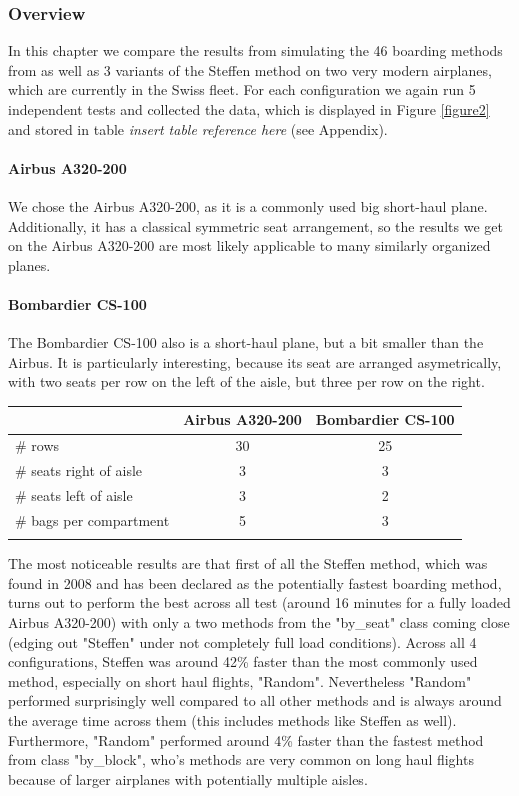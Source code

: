 \documentclass[11pt]{article}
\begin{document}
 
 \subsubsection{Overview}
 In this chapter we compare the results from simulating the 46 boarding methods from \cite{beus} as well as 3 variants of the Steffen method \cite{steffen} on two very modern airplanes, which are currently in the Swiss fleet. For each configuration we again run 5 independent tests and collected the data, which is displayed in Figure \ref{figure2} and stored in table \textit{insert table reference here} (see Appendix). 
 
 
 \paragraph{Airbus A320-200}
 We chose the Airbus A320-200, as it is a commonly used big short-haul plane. Additionally, it has a classical symmetric seat arrangement, so the results we get on the Airbus A320-200 are most likely applicable to many similarly organized planes. 


 \paragraph{Bombardier CS-100}
 The Bombardier CS-100 also is a short-haul plane, but a bit smaller than the Airbus. It is particularly interesting, because its seat are arranged asymetrically, with two seats per row on the left of the aisle, but three per row on the right.  

 \begin{tabular}{l|c c }

	 \hline
	&Airbus A320-200 &Bombardier CS-100 \\
	\hline
\# rows & 30&25   \\
\hline
\# seats right of aisle & 3 & 3 \\
	\hline
	\# seats left of aisle & 3 & 2\\
	\hline
	\# bags per compartment & 5 & 3\\
	\hline
	\\
\end{tabular}

 The most noticeable results are that first of all the Steffen method, which was found in 2008 and has been declared as the potentially fastest boarding method, turns out to perform the best across all test (around 16 minutes for a fully loaded Airbus A320-200) with only a two methods from the "by\_seat" class coming close (edging out "Steffen" under not completely full load conditions). Across all 4 configurations, Steffen was around 42\% faster than the most commonly used method, especially on short haul flights, "Random". Nevertheless "Random" performed surprisingly well compared to all other methods and is always around the average time across them (this includes methods like Steffen as well). Furthermore, "Random" performed around 4\% faster than the fastest method from class "by\_block", who's methods are very common on long haul flights because of larger airplanes with potentially multiple aisles.
 
\end{document}
